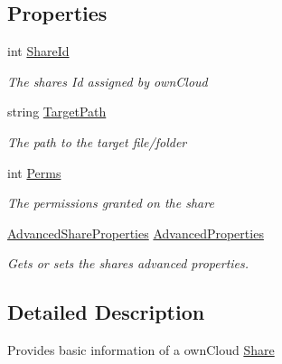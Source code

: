 \subsection*{Properties}
\begin{DoxyCompactItemize}
\item 
int \hyperlink{classowncloudsharp_1_1_types_1_1_share_ada18f7c002805affd1fb26d1a11ea7a9}{Share\+Id}
\begin{DoxyCompactList}\small\item\em The shares Id assigned by own\+Cloud \end{DoxyCompactList}\item 
string \hyperlink{classowncloudsharp_1_1_types_1_1_share_ac2ac95075f60cc369c9f2433f6b4db7d}{Target\+Path}
\begin{DoxyCompactList}\small\item\em The path to the target file/folder \end{DoxyCompactList}\item 
int \hyperlink{classowncloudsharp_1_1_types_1_1_share_a9d6c9011eaba3aa723444e01969bc9b8}{Perms}
\begin{DoxyCompactList}\small\item\em The permissions granted on the share \end{DoxyCompactList}\item 
\hyperlink{classowncloudsharp_1_1_types_1_1_advanced_share_properties}{Advanced\+Share\+Properties} \hyperlink{classowncloudsharp_1_1_types_1_1_share_aeaf2ca3c390ed01433320f86deb53ca5}{Advanced\+Properties}
\begin{DoxyCompactList}\small\item\em Gets or sets the shares advanced properties. \end{DoxyCompactList}\end{DoxyCompactItemize}


\subsection{Detailed Description}
Provides basic information of a own\+Cloud \hyperlink{classowncloudsharp_1_1_types_1_1_share}{Share} 



